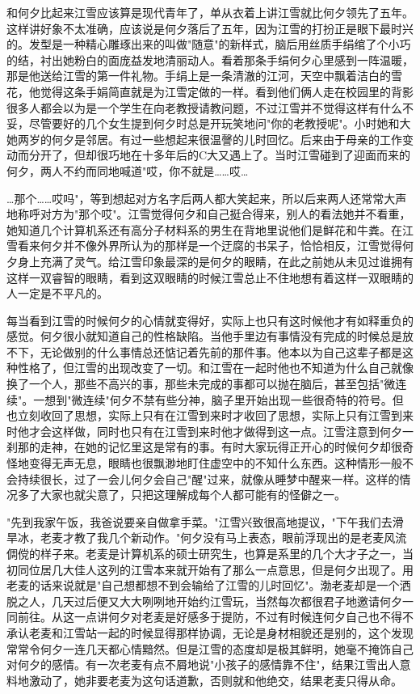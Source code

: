 \documentclass[UTF8]{ctexart}
\begin{document}
和何夕比起来江雪应该算是现代青年了，单从衣着上讲江雪就比何夕领先了五年。这样讲好象不太准确，应该说是何夕落后了五年，因为江雪的打扮正是眼下最时兴的。发型是一种精心雕琢出来的叫做"随意"的新样式，脑后用丝质手绢绾了个小巧的结，衬出她粉白的面庞益发地清丽动人。看着那条手绢何夕心里感到一阵温暖，那是他送给江雪的第一件礼物。手绢上是一条清澈的江河，天空中飘着洁白的雪花，他觉得这条手娟简直就是为江雪定做的一样。看到他们俩人走在校园里的背影很多人都会以为是一个学生在向老教授请教问题，不过江雪并不觉得这样有什么不妥，尽管要好的几个女生提到何夕时总是开玩笑地问"你的老教授呢"。小时她和大她两岁的何夕是邻居。有过一些想起来很温謦的儿时回忆。后来由于母亲的工作变动而分开了，但却很巧地在十多年后的C大又遇上了。当时江雪碰到了迎面而来的何夕，两人不约而同地喊道"哎，你不就是……哎…

…那个……哎吗"，等到想起对方名字后两人都大笑起来，所以后来两人还常常大声地称呼对方为"那个哎"。江雪觉得何夕和自己挺合得来，别人的看法她并不看重，她知道几个计算机系还有高分子材料系的男生在背地里说他们是鲜花和牛粪。在江雪看来何夕并不像外界所认为的那样是一个迂腐的书呆子，恰恰相反，江雪觉得何夕身上充满了灵气。给江雪印象最深的是何夕的眼睛，在此之前她从未见过谁拥有这样一双睿智的眼睛，看到这双眼睛的时候江雪总止不住地想有着这样一双眼睛的人一定是不平凡的。

每当看到江雪的时候何夕的心情就变得好，实际上也只有这时候他才有如释重负的感觉。何夕很小就知道自己的性格缺陷。当他手里边有事情没有完成的时候总是放不下，无论做别的什么事情总还惦记着先前的那件事。他本以为自己这辈子都是这种性格了，但江雪的出现改变了一切。和江雪在一起时他也不知道为什么自己就像换了一个人，那些不高兴的事，那些未完成的事都可以抛在脑后，甚至包括"微连续"。一想到"微连续"何夕不禁有些分神，脑子里开始出现一些很奇特的符号。但也立刻收回了思想，实际上只有在江雪到来时才收回了思想，实际上只有江雪到来时他才会这样做，同时也只有在江雪到来时他才做得到这一点。江雪注意到何夕一刹那的走神，在她的记忆里这是常有的事。有时大家玩得正开心的时候何夕却很奇怪地变得无声无息，眼睛也很飘渺地盯住虚空中的不知什么东西。这种情形一般不会持续很长，过了一会儿何夕会自己"醒"过来，就像从睡梦中醒来一样。这样的情况多了大家也就尖意了，只把这理解成每个人都可能有的怪僻之一。

"先到我家午饭，我爸说要亲自做拿手菜。"江雪兴致很高地提议，"下午我们去滑旱冰，老麦才教了我几个新动作。"何夕没有马上表态，眼前浮现出的是老麦风流倜傥的样子来。老麦是计算机系的硕士研究生，也算是系里的几个大才子之一，当初同位居几大佳人这列的江雪本来就开始有了那么一点意思，但是何夕出现了。用老麦的话来说就是"自己想都想不到会输给了江雪的儿时回忆"。渤老麦却是一个洒脱之人，几天过后便又大大咧咧地开始约江雪玩，当然每次都很君子地邀请何夕一同前往。从这一点讲何夕对老麦是好感多于提防，不过有时候连何夕自己也不得不承认老麦和江雪站一起的时候显得那样协调，无论是身材相貌还是别的，这个发现常常令何夕一连几天都心情黯然。但是江雪的态度却是极其鲜明，她毫不掩饰自己对何夕的感情。有一次老麦有点不屑地说"小孩子的感情靠不住"，结果江雪出人意料地激动了，她非要老麦为这句话道歉，否则就和他绝交，结果老麦只得从命。
\end{document}
